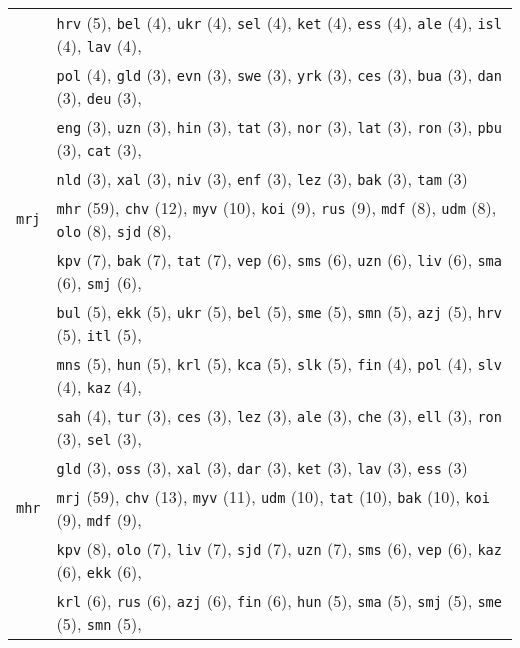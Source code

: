 \begin{center}
\begin{longtable}{ll}
 & \texttt{hrv} (5), \texttt{bel} (4), \texttt{ukr} (4), \texttt{sel} (4), \texttt{ket} (4), \texttt{ess} (4), \texttt{ale} (4), \texttt{isl} (4), \texttt{lav} (4),\\
 & \texttt{pol} (4), \texttt{gld} (3), \texttt{evn} (3), \texttt{swe} (3), \texttt{yrk} (3), \texttt{ces} (3), \texttt{bua} (3), \texttt{dan} (3), \texttt{deu} (3),\\
 & \texttt{eng} (3), \texttt{uzn} (3), \texttt{hin} (3), \texttt{tat} (3), \texttt{nor} (3), \texttt{lat} (3), \texttt{ron} (3), \texttt{pbu} (3), \texttt{cat} (3),\\
 & \texttt{nld} (3), \texttt{xal} (3), \texttt{niv} (3), \texttt{enf} (3), \texttt{lez} (3), \texttt{bak} (3), \texttt{tam} (3) \\
\texttt{mrj} & \texttt{mhr} (59), \texttt{chv} (12), \texttt{myv} (10), \texttt{koi} (9), \texttt{rus} (9), \texttt{mdf} (8), \texttt{udm} (8), \texttt{olo} (8), \texttt{sjd} (8), \\
 & \texttt{kpv} (7), \texttt{bak} (7), \texttt{tat} (7), \texttt{vep} (6), \texttt{sms} (6), \texttt{uzn} (6), \texttt{liv} (6), \texttt{sma} (6), \texttt{smj} (6), \\
 & \texttt{bul} (5), \texttt{ekk} (5), \texttt{ukr} (5), \texttt{bel} (5), \texttt{sme} (5), \texttt{smn} (5), \texttt{azj} (5), \texttt{hrv} (5), \texttt{itl} (5), \\
 & \texttt{mns} (5), \texttt{hun} (5), \texttt{krl} (5), \texttt{kca} (5), \texttt{slk} (5), \texttt{fin} (4), \texttt{pol} (4), \texttt{slv} (4), \texttt{kaz} (4), \\
 & \texttt{sah} (4), \texttt{tur} (3), \texttt{ces} (3), \texttt{lez} (3), \texttt{ale} (3), \texttt{che} (3), \texttt{ell} (3), \texttt{ron} (3), \texttt{sel} (3), \\
 & \texttt{gld} (3), \texttt{oss} (3), \texttt{xal} (3), \texttt{dar} (3), \texttt{ket} (3), \texttt{lav} (3), \texttt{ess} (3) \\
\texttt{mhr} & \texttt{mrj} (59), \texttt{chv} (13), \texttt{myv} (11), \texttt{udm} (10), \texttt{tat} (10), \texttt{bak} (10), \texttt{koi} (9), \texttt{mdf} (9),\\
 & \texttt{kpv} (8), \texttt{olo} (7), \texttt{liv} (7), \texttt{sjd} (7), \texttt{uzn} (7), \texttt{sms} (6), \texttt{vep} (6), \texttt{kaz} (6), \texttt{ekk} (6),\\
 & \texttt{krl} (6), \texttt{rus} (6), \texttt{azj} (6), \texttt{fin} (6), \texttt{hun} (5), \texttt{sma} (5), \texttt{smj} (5), \texttt{sme} (5), \texttt{smn} (5),\\

\end{longtable}
\end{center}
